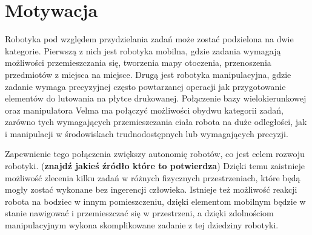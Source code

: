 	\section{Motywacja}
		Robotyka pod względem przydzielania zadań może zostać podzielona na dwie kategorie.
		Pierwszą z nich jest robotyka mobilna, gdzie zadania wymagają możliwości przemieszczania się, tworzenia mapy otoczenia, przenoszenia przedmiotów z miejsca na miejsce. 
		Drugą jest robotyka manipulacyjna, gdzie zadanie wymaga precyzyjnej często powtarzanej operacji jak przygotowanie elementów do lutowania na płytce drukowanej. 
		Połączenie bazy wielokierunkowej oraz manipulatora Velma ma połączyć możliwości obydwu kategorii zadań, zarówno tych wymagających przemieszczania ciała robota na duże odległości, jak i manipulacji w środowiskach trudnodostępnych lub wymagających precyzji.

		Zapewnienie tego połączenia zwiększy autonomię robotów, co jest celem rozwoju robotyki. (\textbf{znajdź jakieś źródło które to potwierdza})
		Dzięki temu zaistnieje możliwość zlecenia kilku zadań w różnych fizycznych przestrzeniach, które będą mogły zostać wykonane bez ingerencji człowieka. 
		Istnieje też możliwość reakcji robota na bodziec w innym pomieszczeniu, dzięki elementom mobilnym będzie  w stanie nawigować i przemieszczać się w przestrzeni, a dzięki zdolnościom manipulacyjnym wykona skomplikowane zadanie z tej dziedziny robotyki.
		